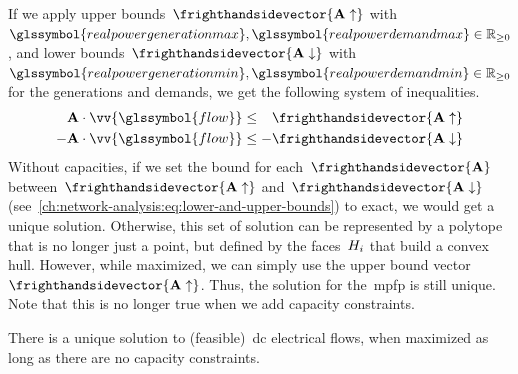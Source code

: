 If we apply upper bounds~$\frighthandsidevector{\constraintmatrix\uparrow}$
with~$
    \glssymbol{realpowergenerationmax}, 
    \glssymbol{realpowerdemandmax}
    \in
    \posreals
$, and lower bounds~$\frighthandsidevector{\constraintmatrix\downarrow}$ with~$
    \glssymbol{realpowergenerationmin}, 
    \glssymbol{realpowerdemandmin}
    \in
    \posreals
$ for the generations and demands, we get the following system of
inequalities.
% 
\begin{subequations}
\begin{align}
    \hphantom{-}\constraintmatrix
    \cdot
    \vv{\glssymbol{flow}} 
    &\leq
    \hphantom{-}\frighthandsidevector{\constraintmatrix\uparrow} 
    \label{ch:network-analysis:eq:upper-bounds}
    \\
    -\constraintmatrix
    \cdot
    \vv{\glssymbol{flow}} 
    &\leq
    -\frighthandsidevector{\constraintmatrix\downarrow} 
    \label{ch:network-analysis:eq:lower-bounds}
\end{align}
\label{ch:network-analysis:eq:lower-and-upper-bounds}
\end{subequations}
% 
Without capacities, if we set the bound for each~$
\frighthandsidevector{\constraintmatrix}$
between~$
    \frighthandsidevector{\constraintmatrix\uparrow}
$ and~$
    \frighthandsidevector{\constraintmatrix\downarrow} 
$ (see~\cref{ch:network-analysis:eq:lower-and-upper-bounds}) to exact, we would
get a unique solution. Otherwise, this set of solution can be represented by a
polytope that is no longer just a point, but defined by the faces~$H_{i}$
that build a convex hull. However, while maximized, we can simply use the upper
bound vector~$\frighthandsidevector{\constraintmatrix\uparrow}$. Thus, the
solution for the~\gls{mpfp} is still unique. Note that this is no longer true
when we add capacity constraints.
% 
\begin{lemma}
    There is a unique solution to (feasible)~\gls{dc} electrical flows, when
    maximized as long as there are no capacity constraints.
\end{lemma}

